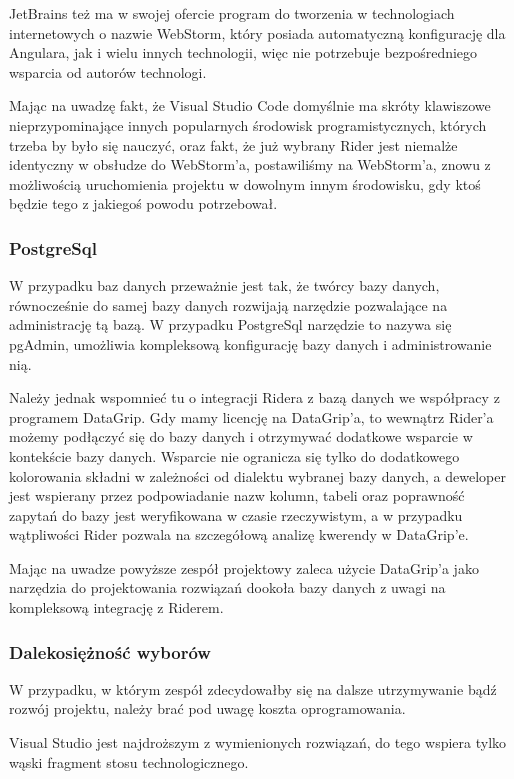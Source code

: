 JetBrains też ma w swojej ofercie program do tworzenia w technologiach internetowych o nazwie WebStorm, który posiada automatyczną konfigurację dla Angulara, jak i wielu innych technologii, więc nie potrzebuje bezpośredniego wsparcia od autorów technologi.

Mając na uwadzę fakt, że Visual Studio Code domyślnie ma skróty klawiszowe nieprzypominające innych popularnych środowisk programistycznych, których trzeba by było się nauczyć, oraz fakt, że już wybrany Rider jest niemalże identyczny w obsłudze do WebStorm'a, postawiliśmy na WebStorm'a, znowu z możliwością uruchomienia projektu w dowolnym innym środowisku, gdy ktoś będzie tego z jakiegoś powodu potrzebował.

\subsubsection{PostgreSql}
W przypadku baz danych przeważnie jest tak, że twórcy bazy danych, równocześnie do samej bazy danych rozwijają narzędzie pozwalające na administrację tą bazą.
W przypadku PostgreSql narzędzie to nazywa się pgAdmin, umożliwia kompleksową konfigurację bazy danych i administrowanie nią.

Należy jednak wspomnieć tu o integracji Ridera z bazą danych we współpracy z programem DataGrip.
Gdy mamy licencję na DataGrip'a, to wewnątrz Rider'a możemy podłączyć się do bazy danych i otrzymywać dodatkowe wsparcie w kontekście bazy danych.
Wsparcie nie ogranicza się tylko do dodatkowego kolorowania składni w zależności od dialektu wybranej bazy danych, a deweloper jest wspierany przez podpowiadanie nazw kolumn, tabeli oraz poprawność zapytań do bazy jest  weryfikowana w czasie rzeczywistym, a w przypadku wątpliwości Rider pozwala na szczegółową analizę kwerendy w DataGrip'e.

Mając na uwadze powyższe zespół projektowy zaleca użycie DataGrip'a jako narzędzia do projektowania rozwiązań dookoła bazy danych z uwagi na kompleksową integrację z Riderem.

\subsubsection{Dalekosiężność wyborów}
W przypadku, w którym zespół zdecydowałby się na dalsze utrzymywanie bądź rozwój projektu, należy brać pod uwagę koszta oprogramowania.

Visual Studio jest najdroższym z wymienionych rozwiązań, do tego wspiera tylko wąski fragment stosu technologicznego.

